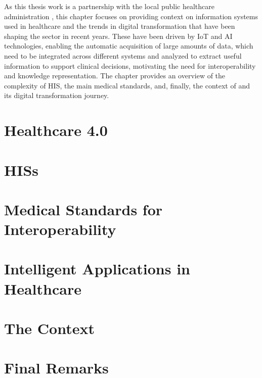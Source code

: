 As this thesis work is a partnership with the local public healthcare administration \ausl{},
this chapter focuses on providing context on information systems used in healthcare and the trends in digital transformation that have been shaping the sector in recent years.
These have been driven by \ac{IoT} and \ac{AI} technologies,
enabling the automatic acquisition of large amounts of data, which need to be integrated across different systems and analyzed to extract useful information to support clinical decisions, motivating the need for interoperability and knowledge representation.
%
The chapter provides an overview of the complexity of \ac{HIS},
the main medical standards, and, finally, the context of \ausl{} and its digital transformation journey.

\section{Healthcare 4.0}





\section{\aclp{HIS}}


\section{Medical Standards for Interoperability}



\section{Intelligent Applications in Healthcare}




\section{The \ausl{} Context}

\section{Final Remarks}
